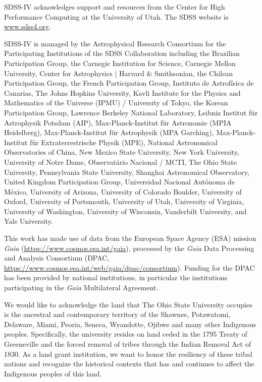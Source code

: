 \documentclass[twocolumn,twocolappendix,linenumbers]{aastex631}
\begin{document}
SDSS-IV acknowledges support and 
resources from the Center for High 
Performance Computing  at the 
University of Utah. The SDSS 
website is \url{www.sdss4.org}.

SDSS-IV is managed by the 
Astrophysical Research Consortium 
for the Participating Institutions 
of the SDSS Collaboration including 
the Brazilian Participation Group, 
the Carnegie Institution for Science, 
Carnegie Mellon University, Center for 
Astrophysics | Harvard \& 
Smithsonian, the Chilean Participation 
Group, the French Participation Group, 
Instituto de Astrof\'isica de 
Canarias, The Johns Hopkins 
University, Kavli Institute for the 
Physics and Mathematics of the 
Universe (IPMU) / University of 
Tokyo, the Korean Participation Group, 
Lawrence Berkeley National Laboratory, 
Leibniz Institut f\"ur Astrophysik 
Potsdam (AIP),  Max-Planck-Institut 
f\"ur Astronomie (MPIA Heidelberg), 
Max-Planck-Institut f\"ur 
Astrophysik (MPA Garching), 
Max-Planck-Institut f\"ur 
Extraterrestrische Physik (MPE), 
National Astronomical Observatories of 
China, New Mexico State University, 
New York University, University of 
Notre Dame, Observat\'ario 
Nacional / MCTI, The Ohio State 
University, Pennsylvania State 
University, Shanghai 
Astronomical Observatory, United 
Kingdom Participation Group, 
Universidad Nacional Aut\'onoma 
de M\'exico, University of Arizona, 
University of Colorado Boulder, 
University of Oxford, University of 
Portsmouth, University of Utah, 
University of Virginia, University 
of Washington, University of 
Wisconsin, Vanderbilt University, 
and Yale University.

This work has made use of data from the European Space Agency (ESA) mission
{\it Gaia} (\url{https://www.cosmos.esa.int/gaia}), processed by the {\it Gaia}
Data Processing and Analysis Consortium (DPAC,
\url{https://www.cosmos.esa.int/web/gaia/dpac/consortium}). Funding for the DPAC
has been provided by national institutions, in particular the institutions
participating in the {\it Gaia} Multilateral Agreement.

We would like to acknowledge the land that The Ohio State University occupies is the ancestral and contemporary territory of the Shawnee, Potawatomi, Delaware, Miami, Peoria, Seneca, Wyandotte, Ojibwe and many other Indigenous peoples. Specifically, the university resides on land ceded in the 1795 Treaty of Greeneville and the forced removal of tribes through the Indian Removal Act of 1830. As a land grant institution, we want to honor the resiliency of these tribal nations and recognize the historical contexts that has and continues to affect the Indigenous peoples of this land.
\end{document}
